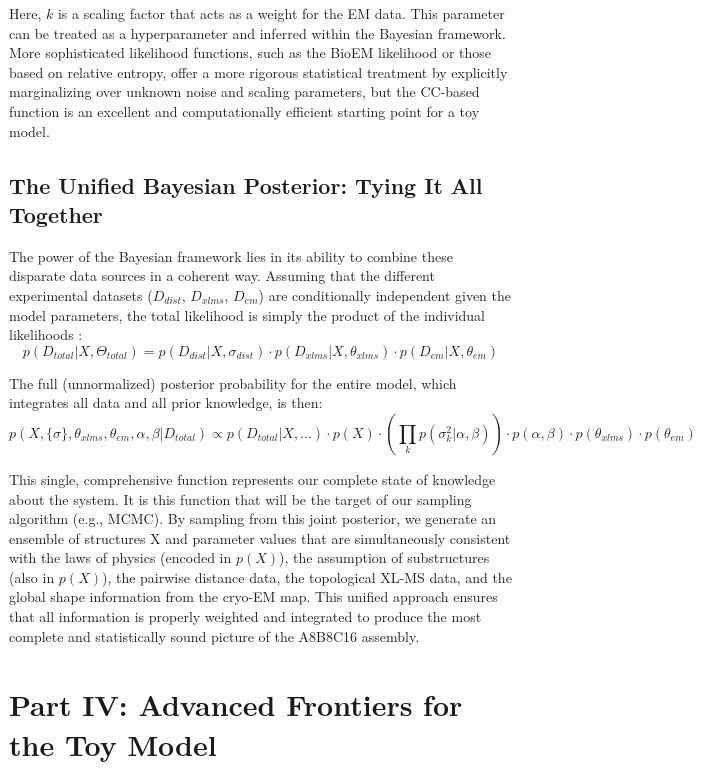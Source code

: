 \documentclass{article}
\begin{document}
Here, $k$ is a scaling factor that acts as a weight for the EM data. This parameter can be treated as a hyperparameter and inferred within the Bayesian framework. More sophisticated likelihood functions, such as the BioEM likelihood or those based on relative entropy, offer a more rigorous statistical treatment by explicitly marginalizing over unknown noise and scaling parameters, but the CC-based function is an excellent and computationally efficient starting point for a toy model.\cite{ref35}

\subsection{The Unified Bayesian Posterior: Tying It All Together}

The power of the Bayesian framework lies in its ability to combine these disparate data sources in a coherent way. Assuming that the different experimental datasets ($D_{dist}$, $D_{xlms}$, $D_{em}$) are conditionally independent given the model parameters, the total likelihood is simply the product of the individual likelihoods \cite{ref4}:
\[ p(D_{total} | X, \Theta_{total}) = p(D_{dist} | X, \sigma_{dist}) \cdot p(D_{xlms} | X, \theta_{xlms}) \cdot p(D_{em} | X, \theta_{em}) \]

The full (unnormalized) posterior probability for the entire model, which integrates all data and all prior knowledge, is then:
\[ p(X, \{\sigma\}, \theta_{xlms}, \theta_{em}, \alpha, \beta | D_{total}) \propto p(D_{total} | X, \dots) \cdot p(X) \cdot \left( \prod_k p(\sigma_k^2 | \alpha, \beta) \right) \cdot p(\alpha, \beta) \cdot p(\theta_{xlms}) \cdot p(\theta_{em}) \]

This single, comprehensive function represents our complete state of knowledge about the system. It is this function that will be the target of our sampling algorithm (e.g., MCMC). By sampling from this joint posterior, we generate an ensemble of structures X and parameter values that are simultaneously consistent with the laws of physics (encoded in $p(X)$), the assumption of substructures (also in $p(X)$), the pairwise distance data, the topological XL-MS data, and the global shape information from the cryo-EM map. This unified approach ensures that all information is properly weighted and integrated to produce the most complete and statistically sound picture of the A8B8C16 assembly.

\section{Part IV: Advanced Frontiers for the Toy Model}
\end{document}
